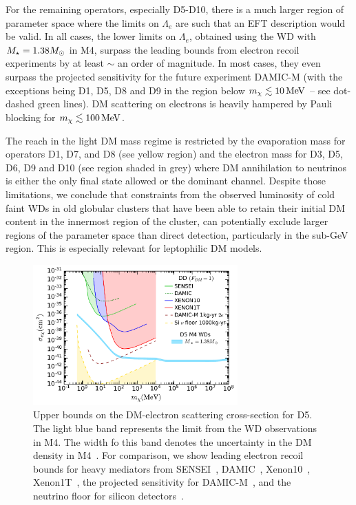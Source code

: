 For the remaining operators, especially D5-D10, there is a much larger region of parameter space where the limits on $\Lambda_e$ are such that an EFT description would be valid. In all cases, the lower limits on $\Lambda_e$, obtained using the WD with $M_\star=1.38M_\odot$ in M4, surpass the leading bounds from electron recoil experiments by at least $\sim$ an order of magnitude.  In most cases, they even surpass the projected sensitivity for the future experiment DAMIC-M (with the exceptions being D1, D5, D8 and D9 in the region below $m_\chi\lesssim10{\rm \,MeV}$ -- see dot-dashed green lines). DM scattering on electrons
is heavily hampered by Pauli blocking for  $m_\chi\lesssim100{\rm \,MeV}$.  

The reach in the light DM mass regime is restricted by the evaporation mass for operators D1, D7, and D8 (see yellow region) and the electron mass for D3, D5, D6, D9 and D10 (see region shaded in grey) where DM annihilation to neutrinos is either the only final state allowed or the dominant channel.  Despite those limitations, we conclude that constraints from the observed luminosity of cold faint WDs in old globular clusters that have been able to retain their initial DM content in the innermost region of the cluster, can potentially exclude larger regions of the parameter space than direct detection, particularly in the sub-GeV region. This is especially relevant for leptophilic DM models.

\begin{figure}
    \centering
  \includegraphics[width=0.7\textwidth]{wd_capture/DD_WD_electrons_D5.pdf}
    \caption[Upper bounds on the DM-electron scattering cross-section for D5.]{Upper bounds on the DM-electron scattering cross-section for D5. The light blue band represents the limit from the WD observations in M4. The width fo this band denotes the uncertainty in the DM density in M4~\cite{McCullough:2010ai_CaptureInelasticDark}.  
     For comparison, we show leading electron recoil bounds for heavy mediators from SENSEI~\cite{SENSEI:2020dpa_SENSEIDirectdetectionresults}, DAMIC~\cite{DAMIC:2019dcn_Constraintslightdark}, Xenon10~\cite{Essig:2017kqs_Newconstraintsprospects}, Xenon1T~\cite{XENON:2019gfn_Lightdarkmatter}, the projected sensitivity for DAMIC-M~\cite{Essig:2015cda_DirectdetectionsubGeV}, and the neutrino floor for silicon detectors~\cite{Essig:2018tss_Solarneutrinossignal}. 
    }
    \label{ch4:fig:D5sigmalimit}
\end{figure}


